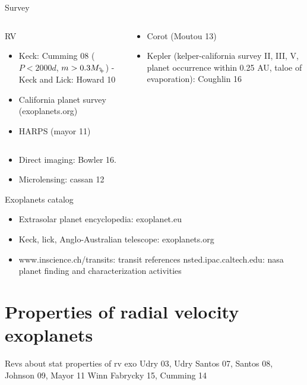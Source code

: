 \begin{frame}[allowframebreaks]{Survey}
\begin{columns}[T]\begin{column}{0.5\textwidth}
\begin{block}{RV}
\begin{itemize}
\item Keck: Cumming 08 ($P<2000d$, $m>0.3\mjupiter$) - Keck and Lick: Howard 10
\item California planet survey (exoplanets.org)
\item HARPS (mayor 11)
\end{itemize}
\end{block}
\end{column}\begin{column}{0.5\textwidth}
\begin{itemize}
\item Corot (Moutou 13)
\item Kepler (kelper-california survey II, III, V, planet occurrence within 0.25 AU, taloe of evaporation): Coughlin 16
\end{itemize}
\end{column}\end{columns}
\begin{itemize}
\item Direct imaging: Bowler 16.
\item Microlensing: cassan 12
\end{itemize}
\begin{block}{Exoplanets catalog}
\begin{itemize}
\item Extrasolar planet encyclopedia: exoplanet.eu
\item Keck, lick, Anglo-Australian telescope: exoplanets.org
\item www.inscience.ch/transits: transit references
nsted.ipac.caltech.edu: nasa planet finding and characterization activities 
\end{itemize}
\end{block}
\end{frame}

\section{Properties of radial velocity exoplanets}
%
\begin{wordonframe}{Revs about stat properties of rv exo}
Udry 03, Udry Santos 07, Santos 08, Johnson 09, Mayor 11 Winn Fabrycky 15, Cumming 14
\end{wordonframe}

